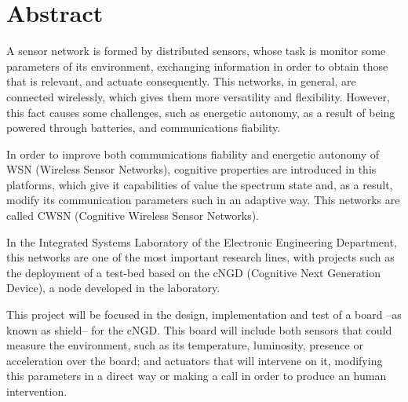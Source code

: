 %
%
%
%
%

\chapter{Abstract}

A sensor network is formed by distributed sensors, whose task is monitor some parameters of its environment, exchanging information in order to obtain those that is relevant, and actuate consequently. This networks, in general, are connected wirelessly, which gives them more versatility and flexibility. However, this fact causes some challenges, such as energetic autonomy, as a result of being powered through batteries, and communications fiability.

\vspace{.5cm}

In order to improve both communications fiability and energetic autonomy of WSN (Wireless Sensor Networks), cognitive properties are introduced in this platforms, which give it capabilities of value the spectrum state and, as a result, modify its communication parameters such in an adaptive way. This networks are called CWSN (Cognitive Wireless Sensor Networks).

\vspace{.5cm}

In the Integrated Systems Laboratory of the Electronic Engineering Department, this networks are one of the most important research lines, with projects such as the deployment of a test-bed based on the cNGD (Cognitive Next Generation Device), a node developed in the laboratory.

\vspace{.5cm}

This project will be focused in the design, implementation and test of a board --as known as shield-- for the cNGD. This board will include both sensors that could measure the environment, such as its temperature, luminosity, presence or acceleration over the board; and actuators that will intervene on it, modifying this parameters in a direct way or making a call in order to produce an human intervention.

\vspace{.5cm}


